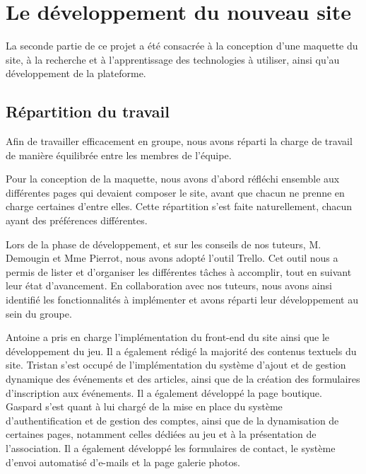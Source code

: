 \chapter{Le développement du nouveau site}



La seconde partie de ce projet a été consacrée à la conception d'une maquette du site, à la recherche et à l’apprentissage des technologies à utiliser, ainsi qu’au développement de la plateforme.

\section{Répartition du travail}

Afin de travailler efficacement en groupe, nous avons réparti la charge de travail de manière équilibrée entre les membres de l'équipe.

Pour la conception de la maquette, nous avons d'abord réfléchi ensemble aux différentes pages qui devaient composer le site, avant que chacun ne prenne en charge certaines d’entre elles. Cette répartition s’est faite naturellement, chacun ayant des préférences différentes.

Lors de la phase de développement, et sur les conseils de nos tuteurs, M. Demougin et Mme Pierrot, nous avons adopté l’outil Trello. Cet outil nous a permis de lister et d’organiser les différentes tâches à accomplir, tout en suivant leur état d'avancement. En collaboration avec nos tuteurs, nous avons ainsi identifié les fonctionnalités à implémenter et avons réparti leur développement au sein du groupe.

Antoine a pris en charge l’implémentation du front-end du site ainsi que le développement du jeu. Il a également rédigé la majorité des contenus textuels du site. Tristan s’est occupé de l’implémentation du système d’ajout et de gestion dynamique des événements et des articles, ainsi que de la création des formulaires d’inscription aux événements. Il a également développé la page boutique. Gaspard s’est quant à lui chargé de la mise en place du système d’authentification et de gestion des comptes, ainsi que de la dynamisation de certaines pages, notamment celles dédiées au jeu et à la présentation de l’association. Il a également développé les formulaires de contact, le système d’envoi automatisé d’e-mails et la page galerie photos.

